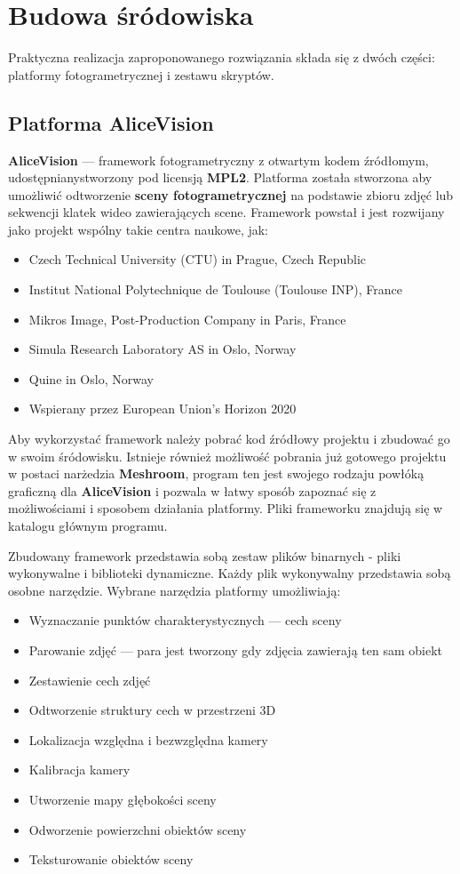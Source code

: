 \chapter{Budowa śródowiska}

Praktyczna realizacja zaproponowanego rozwiązania składa się z dwóch części: platformy fotogrametrycznej i zestawu skryptów.

\section{Platforma AliceVision}

\textbf{AliceVision} --- framework fotogrametryczny z otwartym kodem źródłomym, udostępnianystworzony pod licensją \textbf{MPL2}.
Platforma została stworzona aby umożliwić odtworzenie \textbf{sceny fotogrametrycznej} na podstawie zbioru zdjęć lub sekwencji klatek wideo zawierających scene. Framework powstał i jest rozwijany jako projekt wspólny takie centra naukowe, jak:
\begin{itemize}
   \item Czech Technical University (CTU) in Prague, Czech Republic
   \item Institut National Polytechnique de Toulouse (Toulouse INP), France
   \item Mikros Image, Post-Production Company in Paris, France
   \item Simula Research Laboratory AS in Oslo, Norway
   \item Quine in Oslo, Norway
   \item Wspierany przez European Union’s Horizon 2020
\end{itemize}

Aby wykorzystać framework należy pobrać kod źródłowy projektu i zbudować go w swoim śródowisku.
Istnieje również możliwość pobrania już gotowego projektu w postaci narżedzia \textbf{Meshroom}, program ten jest swojego rodzaju powłóką graficzną dla \textbf{AliceVision} i pozwala w łatwy sposób zapoznać się z możliwościami i sposobem działania platformy.
Pliki frameworku znajdują się w katalogu głównym programu.

Zbudowany framework przedstawia sobą zestaw plików binarnych - pliki wykonywalne i biblioteki dynamiczne.
Każdy plik wykonywalny przedstawia sobą osobne narzędzie.
Wybrane narzędzia platformy umożliwiają:
\begin{itemize}
   \item Wyznaczanie punktów charakterystycznych --- cech sceny
   \item Parowanie zdjęć --- para jest tworzony gdy zdjęcia zawierają ten sam obiekt
   \item Zestawienie cech zdjęć
   \item Odtworzenie struktury cech w przestrzeni 3D
   \item Lokalizacja względna i bezwzględna kamery
   \item Kalibracja kamery
   \item Utworzenie mapy głębokości sceny
   \item Odworzenie powierzchni obiektów sceny
   \item Teksturowanie obiektów sceny
\end{itemize}

